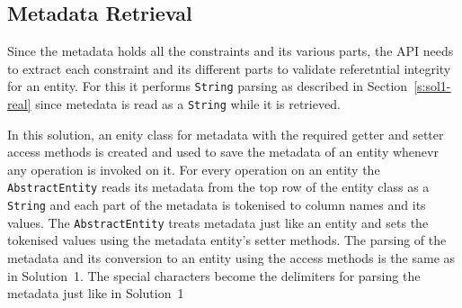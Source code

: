 % 	
% 
	
	\subsection{Metadata Retrieval}
	Since the metadata holds all the constraints and its various parts, the
	\ac{API} needs to extract each constraint and its different parts to validate
	referetntial integrity for an entity. For this it performs \texttt{String}
	parsing as described in Section~\ref{s:sol1-real} since metedata is read as a
	\texttt{String} while it is retrieved.
	
	In this solution, an enity class
	for metadata with the required getter and setter access methods is created and
	used to save the metadata of an entity whenevr any operation is invoked on it.
	For every operation on an entity the \texttt{AbstractEntity}
	reads its metadata from the top row of the entity class as a \texttt{String}
	and each part of the metadata is tokenised to column names and its values.
	The \texttt{AbstractEntity} treats metadata just like an
	entity and sets the tokenised values using the metadata entity's setter
	methods.
	The parsing of the metadata and its conversion to an entity using the access methods is the same as
	in Solution~1. The special characters become the delimiters for parsing the
	metadata just like in Solution~1
	
